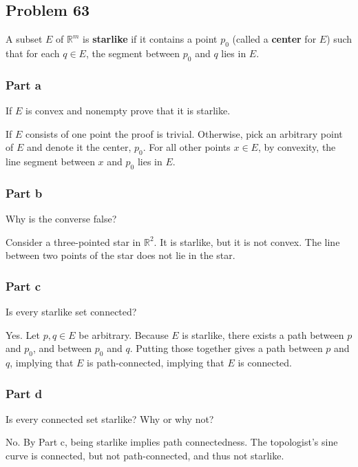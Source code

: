 \documentclass{article}
\newcommand{\R}{\mathbb{R}}
\begin{document}
\subsection*{Problem 63}

A subset $E$ of $\R^m$ is \textbf{starlike} if it contains a point $p_0$ (called a \textbf{center} for $E$) such that for each $q \in E$, the segment between $p_0$ and $q$ lies in $E$.

\subsubsection*{Part a}

If $E$ is convex and nonempty prove that it is starlike.

If $E$ consists of one point the proof is trivial. Otherwise, pick an arbitrary point of $E$ and denote it the center, $p_0$. For all other points $x \in E$, by convexity, the line segment between $x$ and $p_0$ lies in $E$. 

\subsubsection*{Part b}

Why is the converse false?

Consider a three-pointed star in $\R^2$. It is starlike, but it is not convex. The line between two points of the star does not lie in the star.

\subsubsection*{Part c}

Is every starlike set connected?

Yes. Let $p, q \in E$ be arbitrary. Because $E$ is starlike, there exists a path between $p$ and $p_0$, and between $p_0$ and $q$. Putting those together gives a path between $p$ and $q$, implying that $E$ is path-connected, implying that $E$ is connected.

\subsubsection*{Part d}

Is every connected set starlike? Why or why not?

No. By Part c, being starlike implies path connectedness. The topologist's sine curve is connected, but not path-connected, and thus not starlike.
\end{document}
